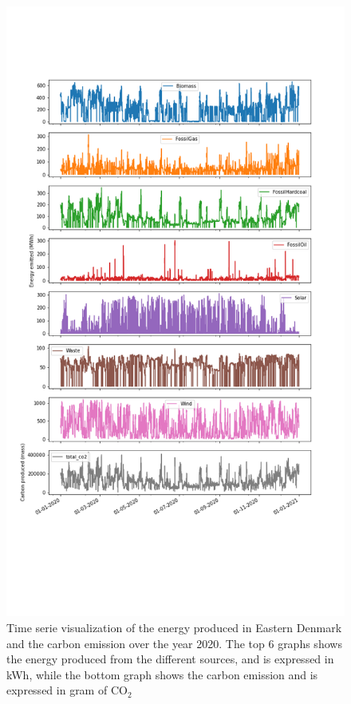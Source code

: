 \documentclass[11pt]{article} %
\begin{document}
\begin{figure}[h!]
  \includegraphics[width=0.8\linewidth]{../outputs/energy_production_time_serie.png}
  \caption{Time serie visualization of the energy produced in Eastern Denmark and the carbon emission over the year 2020. The top 6 graphs shows the energy produced from the different sources, and is expressed in kWh, while the bottom graph shows the carbon emission and is expressed in gram of CO$_2$}
  \label{fig:time_series}
\end{figure}



\clearpage\newpage
\appendix
\end{document}
